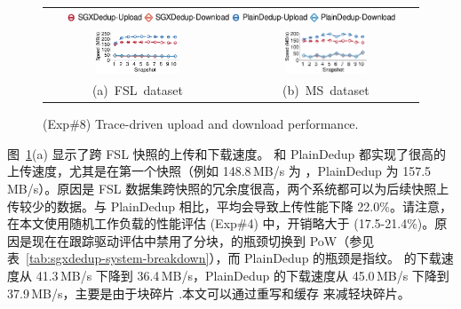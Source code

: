 \begin{figure}[t]
  \centering
  \begin{tabular}{@{\ }c@{\ }c}
  \multicolumn{2}{c}{\includegraphics[width=0.9\textwidth]{pic/sgxdedup/expb2_trace_legend.pdf}} \\
  \hspace{-0.1in}
  \includegraphics[width=0.47\textwidth]{pic/sgxdedup/expb2_trace_fsl_plain_sgx.pdf} &
  \includegraphics[width=0.47\textwidth]{pic/sgxdedup/expb2_trace_ms_plain_sgx.pdf}
  \vspace{-3pt}\\
  \mbox{\small (a) FSL dataset} &
  \mbox{\small (b) MS dataset}
  \end{tabular}
  \vspace{-6pt}
  \caption{(Exp\#8) Trace-driven upload and download performance.}
  \label{fig:sgxdedup-tracePerformance}
\end{figure}

图~\ref{fig:sgxdedup-tracePerformance}(a) 显示了跨 FSL 快照的上传和下载速度。 \sysnameS 和 PlainDedup 都实现了很高的上传速度，尤其是在第一个快照（例如 148.8\,MB/s \sysnameS 为 ，PlainDedup 为 157.5\,MB/s）。原因是 FSL 数据集跨快照的冗余度很高，两个系统都可以为后续快照上传较少的数据。与 PlainDedup 相比，\sysnameS 平均会导致上传性能下降 22.0\%。请注意，在本文使用随机工作负载的性能评估 (Exp\#4) 中，开销略大于 (17.5-21.4\%)。原因是现在在跟踪驱动评估中禁用了分块，\sysnameS 的瓶颈切换到 PoW（参见表~\ref{tab:sgxdedup-system-breakdown}），而 PlainDedup 的瓶颈是指纹。 \sysnameS 的下载速度从 41.3\,MB/s 下降到 36.4\,MB/s，PlainDedup 的下载速度从 45.0\,MB/s 下降到 37.9\,MB/s，主要是由于块碎片 \cite{lillibridge13} .本文可以通过重写和缓存 \cite{lillibridge13,cao2018ALACC} 来减轻块碎片。

